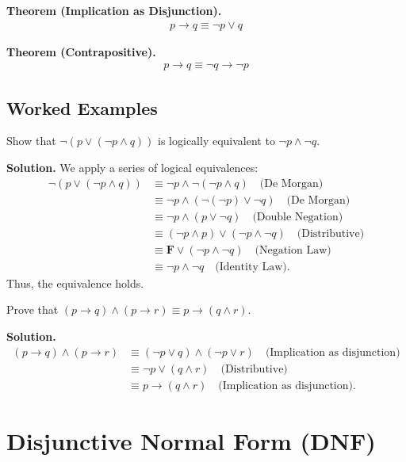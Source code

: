 \documentclass[11pt,a4paper]{article}
\begin{document}
\textbf{Theorem (Implication as Disjunction).}
\begin{align*}
    p \to q \equiv \neg p \lor q
\end{align*}

\textbf{Theorem (Contrapositive).}
\begin{align*}
    p \to q \equiv \neg q \to \neg p
\end{align*}

\subsection{Worked Examples}

\begin{example}
Show that $\neg(p \lor (\neg p \land q))$ is logically equivalent to $\neg p \land \neg q$.

\textbf{Solution.} We apply a series of logical equivalences:
\begin{align*}
    \neg(p \lor (\neg p \land q)) &\equiv \neg p \land \neg(\neg p \land q) \quad \text{(De Morgan)} \\
    &\equiv \neg p \land (\neg(\neg p) \lor \neg q) \quad \text{(De Morgan)} \\
    &\equiv \neg p \land (p \lor \neg q) \quad \text{(Double Negation)} \\
    &\equiv (\neg p \land p) \lor (\neg p \land \neg q) \quad \text{(Distributive)} \\
    &\equiv \mathbf{F} \lor (\neg p \land \neg q) \quad \text{(Negation Law)} \\
    &\equiv \neg p \land \neg q \quad \text{(Identity Law)}.
\end{align*}
Thus, the equivalence holds.
\end{example}

\begin{example}
Prove that $(p \to q) \land (p \to r) \equiv p \to (q \land r)$.

\textbf{Solution.}
\begin{align*}
    (p \to q) \land (p \to r) &\equiv (\neg p \lor q) \land (\neg p \lor r) \quad \text{(Implication as disjunction)} \\
    &\equiv \neg p \lor (q \land r) \quad \text{(Distributive)} \\
    &\equiv p \to (q \land r) \quad \text{(Implication as disjunction)}.
\end{align*}
\end{example}

\section{Disjunctive Normal Form (DNF)}
\end{document}
